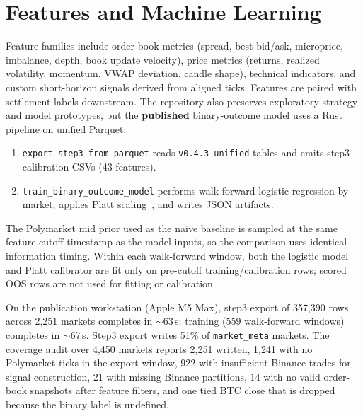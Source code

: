 \section{Features and Machine Learning}
\label{sec:ml}

Feature families include order-book metrics (spread, best bid/ask, microprice,
imbalance, depth, book update velocity), price metrics (returns, realized
volatility, momentum, VWAP deviation, candle shape), technical indicators, and
custom short-horizon signals derived from aligned ticks. Features are paired
with settlement labels downstream. The repository also preserves exploratory
strategy and model prototypes, but the \textbf{published} binary-outcome model
uses a Rust pipeline on unified Parquet:

\begin{enumerate}
  \item \texttt{export\_step3\_from\_parquet} reads \texttt{v0.4.3-unified}
        tables and emits step3 calibration CSVs (43 features).
  \item \texttt{train\_binary\_outcome\_model} performs walk-forward logistic
        regression by market, applies Platt scaling~\cite{platt1999probabilistic},
        and writes JSON artifacts.
\end{enumerate}
The Polymarket mid prior used as the naive baseline is sampled at the same
feature-cutoff timestamp as the model inputs, so the comparison uses identical
information timing. Within each walk-forward window, both the logistic model
and Platt calibrator are fit only on pre-cutoff training/calibration rows;
scored OOS rows are not used for fitting or calibration.

On the publication workstation (Apple M5 Max), step3 export of 357{,}390 rows
across 2{,}251 markets completes in ${\sim}$63\,s; training (559 walk-forward
windows) completes in ${\sim}$67\,s. Step3 export writes 51\% of
\texttt{market\_meta} markets. The coverage audit over 4{,}450 markets reports
2{,}251 written, 1{,}241 with no Polymarket ticks in the export window, 922
with insufficient Binance trades for signal construction, 21 with missing
Binance partitions, 14 with no valid order-book snapshots after feature filters,
and one tied BTC close that is dropped because the binary label is undefined.

